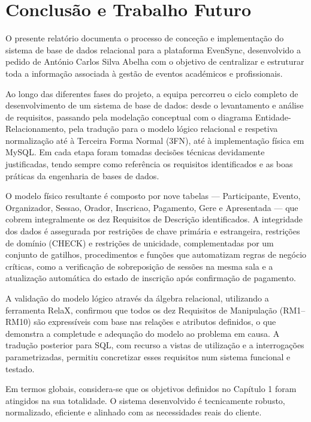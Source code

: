 \documentclass[runningheads]{llncs}
\begin{document}
        \section{Conclusão e Trabalho Futuro}

        O presente relatório documenta o processo de conceção e implementação do sistema de base de dados 
        relacional para a plataforma EvenSync, desenvolvido a pedido de António Carlos Silva Abelha com o objetivo de 
        centralizar e estruturar toda a informação associada à gestão de eventos académicos e profissionais.
        
        Ao longo das diferentes fases do projeto, a equipa percorreu o ciclo completo de desenvolvimento de 
        um sistema de base de dados: desde o levantamento e análise de requisitos, passando pela modelação 
        conceptual com o diagrama Entidade-Relacionamento, pela tradução para o modelo lógico relacional e 
        respetiva normalização até à Terceira Forma Normal (3FN), até à implementação física em MySQL. Em 
        cada etapa foram tomadas decisões técnicas devidamente justificadas, tendo sempre como referência os 
        requisitos identificados e as boas práticas da engenharia de bases de dados.
        
        O modelo físico resultante é composto por nove tabelas — Participante, Evento, Organizador, Sessao, 
        Orador, Inscricao, Pagamento, Gere e Apresentada — que cobrem integralmente os dez Requisitos de 
        Descrição identificados. A integridade dos dados é assegurada por restrições de chave primária e estrangeira, 
        restrições de domínio (CHECK) e restrições de unicidade, complementadas por um conjunto de gatilhos, procedimentos 
        e funções que automatizam regras de negócio críticas, como a verificação de sobreposição de sessões na mesma sala e a 
        atualização automática do estado de inscrição após confirmação de pagamento.
        
        A validação do modelo lógico através da álgebra relacional, utilizando a ferramenta RelaX, confirmou que todos os dez 
        Requisitos de Manipulação (RM1–RM10) são expressíveis com base nas relações e atributos definidos, o que demonstra a 
        completude e adequação do modelo ao problema em causa. A tradução posterior para SQL, com recurso a vistas de utilização 
        e a interrogações parametrizadas, permitiu concretizar esses requisitos num sistema funcional e testado.
        
        Em termos globais, considera-se que os objetivos definidos no Capítulo 1 foram atingidos na sua totalidade. O sistema 
        desenvolvido é tecnicamente robusto, normalizado, eficiente e alinhado com as necessidades reais do cliente.
        
\end{document}
